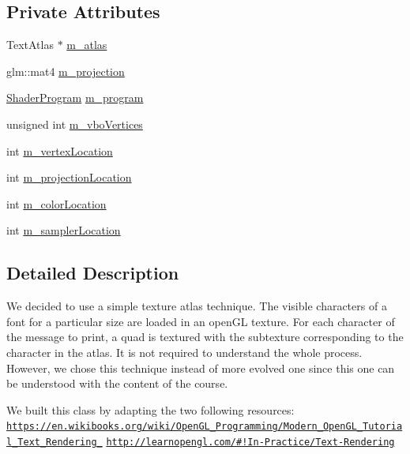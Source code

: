 \subsection*{Private Attributes}
\begin{DoxyCompactItemize}
\item 
Text\+Atlas $\ast$ \hyperlink{classTextEngine_afd5f444cf365a23d5d811d79a1046e11}{m\+\_\+atlas}
\item 
glm\+::mat4 \hyperlink{classTextEngine_af7f6f9d9abc900fa5383999f115e24ae}{m\+\_\+projection}
\item 
\hyperlink{classShaderProgram}{Shader\+Program} \hyperlink{classTextEngine_a00abe5f39d00bc436937ab283e585f3f}{m\+\_\+program}
\item 
unsigned int \hyperlink{classTextEngine_ab64d559d7eb3fed8228c43c919c0cc42}{m\+\_\+vbo\+Vertices}
\item 
int \hyperlink{classTextEngine_a5172679b8715801cf0c3247366238d57}{m\+\_\+vertex\+Location}
\item 
int \hyperlink{classTextEngine_ade64d7603bb434bf411aec352e9d8e50}{m\+\_\+projection\+Location}
\item 
int \hyperlink{classTextEngine_a318576a75e542849a9a733c55823561e}{m\+\_\+color\+Location}
\item 
int \hyperlink{classTextEngine_afa7486707c1a18c2bf83ffaa93564bff}{m\+\_\+sampler\+Location}
\end{DoxyCompactItemize}


\subsection{Detailed Description}
We decided to use a simple texture atlas technique. The visible characters of a font for a particular size are loaded in an open\+G\+L texture. For each character of the message to print, a quad is textured with the subtexture corresponding to the character in the atlas. It is not required to understand the whole process. However, we chose this technique instead of more evolved one since this one can be understood with the content of the course.

We built this class by adapting the two following resources\+: \href{https://en.wikibooks.org/wiki/OpenGL_Programming/Modern_OpenGL_Tutorial_Text_Rendering_01}{\tt https\+://en.\+wikibooks.\+org/wiki/\+Open\+G\+L\+\_\+\+Programming/\+Modern\+\_\+\+Open\+G\+L\+\_\+\+Tutorial\+\_\+\+Text\+\_\+\+Rendering\+\_} \href{http://learnopengl.com/#!In-Practice/Text-Rendering}{\tt http\+://learnopengl.\+com/\#!\+In-\/\+Practice/\+Text-\/\+Rendering}

